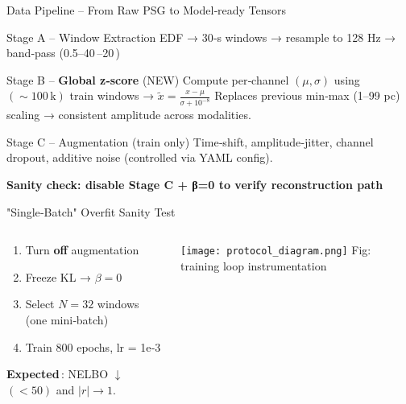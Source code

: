 \documentclass[aspectratio=169,11pt]{beamer}
\newcommand{\highlightbox}[2][tcairemred]{%
  \begin{center}
    \colorbox{#1!20}{\parbox{0.9\textwidth}{\centering\textcolor{#1}{\textbf{#2}}}}
  \end{center}}
\begin{document}

\begin{frame}{Data Pipeline – From Raw PSG to Model‑ready Tensors}
\begin{block}{Stage A – Window Extraction}
\small EDF → 30‑s windows → resample to 128 Hz → band‑pass (0.5–40\,–20\,)
\end{block}

\begin{block}{Stage B – \textcolor{tcairemred}{\textbf{Global z‑score}} (NEW)}
\small Compute per‑channel $(\mu,\sigma)$ using $(\sim100\,\text{k})$ train windows → $\tilde{x} = \frac{x-\mu}{\sigma+10^{-8}}$
\vspace{0.2em}
Replaces previous min‑max (1–99 pc) scaling → consistent amplitude across modalities.
\end{block}

\begin{block}{Stage C – Augmentation (train only)}
\small Time‑shift, amplitude‑jitter, channel dropout, additive noise (controlled via YAML config).
\end{block}

\highlightbox[tcairempurple]{Sanity check: disable Stage C + β=0 to verify reconstruction path}
\end{frame}

\begin{frame}{"Single‑Batch" Overfit Sanity Test}
\begin{columns}[T]
\begin{column}{0.55\textwidth}
\begin{enumerate}\itemsep0.25em
\item Turn \textbf{off} augmentation
\item Freeze KL → $\beta=0$
\item Select $N=32$ windows (one mini‑batch)
\item Train 800 epochs, lr = 1e‑3
\end{enumerate}

\vspace{0.6em}
\textbf{Expected}\,: NELBO $\downarrow$ $(<50)$ and $|r| \to1$.
\end{column}

\begin{column}{0.43\textwidth}
\centering
\texttt{[image: protocol\_diagram.png]}
\tiny Fig: training loop instrumentation
\end{column}
\end{columns}
\end{frame}
\end{document}
